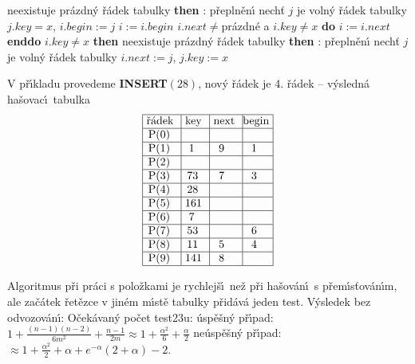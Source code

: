 \documentclass[a4paper,12pt]{article}
\begin{document}
\phantom{------}{\bf if} neexistuje pr\'azdn\'y \v r\'adek tabulky {\bf then}\newline 
\phantom{---------}{\bf V\'ystup}: p\v repln\v en\'\i\newline 
\phantom{------}{\bf else}\newline 
\phantom{---------}nech\v t $j$ je voln\'y \v r\'adek tabulky\newline 
\phantom{---------}$j.key=x$, $i.begin:=j$\newline 
\phantom{------}{\bf endif}\newline 
\phantom{---}{\bf endif\newline 
else}\newline 
\phantom{---}$i:=i.begin$\newline
\phantom{---}{\bf while} $i.next\ne$pr\'azdn\'e a $i.key\ne x$ {\bf do} $i:=i.next$ {\bf enddo}\newline 
\phantom{---}{\bf if} $i.key\ne x$ {\bf then}\newline 
\phantom{------}{\bf if} neexistuje pr\'azdn\'y \v r\'adek tabulky {\bf then}\newline 
\phantom{---------}{\bf V\'ystup}: p\v repln\v en\'\i\newline 
\phantom{------}{\bf else}\newline 
\phantom{---------}nech\v t $j$ je voln\'y \v r\'adek tabulky\newline 
\phantom{---------}$i.next:=j$, $j.key:=x$\newline 
\phantom{------}{\bf endif}\newline 
\phantom{---}{\bf endif\newline 
endif}
\bigskip

\flushpar V p\v r\'\i kladu provedeme {\bf INSERT$(28)$}, nov\'y \v r\'adek je 4. 
\v r\'adek\newline 
-- v\'ysledn\'a ha\v sovac\'\i\ tabulka
$$\vtop{\offinterlineskip\halign {\strut\vrule\ # & \vrule\ # & \vrule\ # & \vrule \hfil # \hfil \vrule\cr\noalign{\hrule}\v r\'adek & key & next & begin\hfil \cr\noalign{\hrule}P(0) & & &\hfill \cr\noalign{\hrule}P(1) & 1 & 9 & 1 \cr\noalign{\hrule}P(2) & & &\hfill \cr\noalign{\hrule}P(3) & 73 & 7 & 3 \cr\noalign{\hrule}P(4) & 28 &  &\hfill \cr\noalign{\hrule}P(5) & 161 & & \hfill \cr\noalign{\hrule}P(6) & 7 & &\hfill \cr\noalign{\hrule}P(7) & 53 & & 6 \cr\noalign{\hrule}P(8) & 11 & 5 & 4  \cr\noalign{\hrule}P(9) & 141 & 8 & \hfill \cr\noalign{\hrule}}}$$

\flushpar Algoritmus p\v ri pr\'aci s polo\v zkami je rychlej\v s\'\i\ ne\v z p\v ri 
ha\v sov\'an\'\i\ s p\v rem\'\i s\v tov\'an\'\i m, ale za\v c\'atek \v ret\v ezce v 
jin\'em m\'\i st\v e tabulky p\v rid\'av\'a jeden test. V\'ysledek bez 
odvozov\'an\'\i :\newline 
O\v cek\'avan\'y po\v cet test\accent23u:\newline 
\phantom{---}\'usp\v e\v sn\'y p\v r\'\i pad: $1+\frac {(n-1)(n-2
)}{6m^2}+\frac {n-1}{2m}\approx 1+\frac {\alpha^2}6+\frac {\alpha}
2$\newline 
\phantom{---}ne\'usp\v e\v sn\'y p\v r\'\i pad: $\approx 1+\frac {
\alpha^2}2+\alpha +e^{-\alpha}(2+\alpha )-2$.
\end{document}

